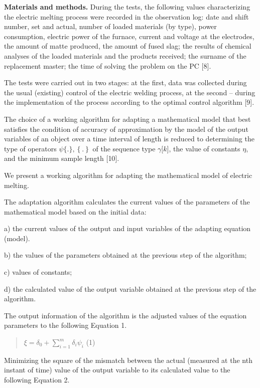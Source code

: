 \textbf{Materials and methods.} During the tests, the following values
characterizing the electric melting process were recorded in the
observation log: date and shift number, set and actual, number of loaded
materials (by type), power consumption, electric power of the furnace,
current and voltage at the electrodes, the amount of matte produced, the
amount of fused slag; the results of chemical analyses of the loaded
materials and the products received; the surname of the replacement
master; the time of solving the problem on the PC {[}8{]}.

The tests were carried out in two stages: at the first, data was
collected during the usual (existing) control of the electric welding
process, at the second -- during the implementation of the process
according to the optimal control algorithm {[}9{]}.

The choice of a working algorithm for adapting a mathematical model that
best satisfies the condition of accuracy of approximation by the model
of the output variables of an object over a time interval of length is
reduced to determining the type of operators
\(\psi\{.\},\left\{ . \right\}\) of the sequence type
\(\gamma\lbrack k\rbrack\), the value of constants \(\eta\), and the
minimum sample length {[}10{]}.

We present a working algorithm for adapting the mathematical model of
electric melting.

The adaptation algorithm calculates the current values of the parameters
of the mathematical model based on the initial data:

a) the current values of the output and input variables of the adapting
equation (model).

b) the values of the parameters obtained at the previous step of the
algorithm;

c) values of constants;

d) the calculated value of the output variable obtained at the previous
step of the algorithm.

The output information of the algorithm is the adjusted values of the
equation parameters to the following Equation 1.

\begin{quote}
\(\xi = \delta_{0} + \sum_{i = 1}^{m}\delta_{i}\psi_{i}\) (1)
\end{quote}

Minimizing the square of the mismatch between the actual (measured at
the nth instant of time) value of the output variable to its calculated
value to the following Equation 2.

